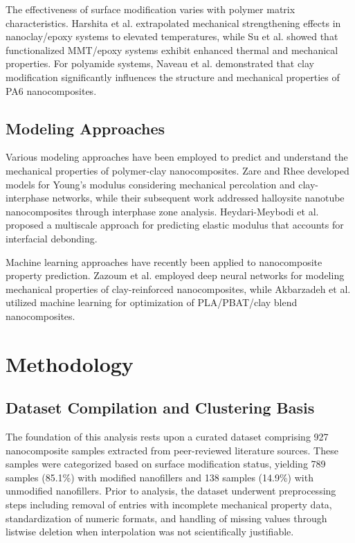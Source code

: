\documentclass[conference]{IEEEtran}
\begin{document}
The effectiveness of surface modification varies with polymer matrix characteristics. Harshita et al. \cite{harshita2018extrapolation} extrapolated mechanical strengthening effects in nanoclay/epoxy systems to elevated temperatures, while Su et al. \cite{su2024functionalized} showed that functionalized MMT/epoxy systems exhibit enhanced thermal and mechanical properties. For polyamide systems, Naveau et al. \cite{naveau2011effect} demonstrated that clay modification significantly influences the structure and mechanical properties of PA6 nanocomposites.

\subsection{Modeling Approaches}

Various modeling approaches have been employed to predict and understand the mechanical properties of polymer-clay nanocomposites. Zare and Rhee \cite{zare2020simulation} developed models for Young's modulus considering mechanical percolation and clay-interphase networks, while their subsequent work \cite{zare2022development} addressed halloysite nanotube nanocomposites through interphase zone analysis. Heydari-Meybodi et al. \cite{heydari2015new} proposed a multiscale approach for predicting elastic modulus that accounts for interfacial debonding.

Machine learning approaches have recently been applied to nanocomposite property prediction. Zazoum et al. \cite{zazoum2020modeling} employed deep neural networks for modeling mechanical properties of clay-reinforced nanocomposites, while Akbarzadeh et al. \cite{akbarzadeh2024machine} utilized machine learning for optimization of PLA/PBAT/clay blend nanocomposites.

\section{Methodology}

\subsection{Dataset Compilation and Clustering Basis}

The foundation of this analysis rests upon a curated dataset comprising 927 nanocomposite samples extracted from peer-reviewed literature sources. These samples were categorized based on surface modification status, yielding 789 samples (85.1\%) with modified nanofillers and 138 samples (14.9\%) with unmodified nanofillers. Prior to analysis, the dataset underwent preprocessing steps including removal of entries with incomplete mechanical property data, standardization of numeric formats, and handling of missing values through listwise deletion when interpolation was not scientifically justifiable.
\end{document}
